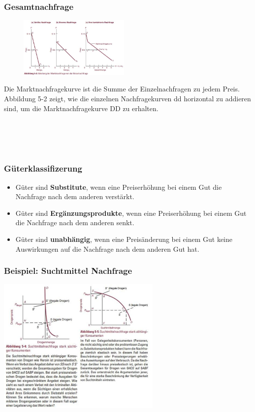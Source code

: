 \documentclass[10pt]{scrartcl}
\begin{document}
\subsubsection{Gesamtnachfrage}
\begin{figure}
\vspace{-20pt}
  \begin{center}
    \includegraphics[width=0.48\textwidth]{img/kombinierte-nachfrage.jpg}
  \end{center}
  \vspace{-20pt}
\end{figure}
Die Marktnachfragekurve ist die Summe der Einzelnachfragen zu jedem Preis. Abbildung 5-2 zeigt, wie die einzelnen Nachfragekurven dd horizontal zu addieren sind, um die 
Marktnachfragekurve DD zu erhalten. \\ \\ \\ \\ \\
\subsubsection{Güterklassifizerung}
\begin{itemize}
\item Güter sind {\bf Substitute}, wenn eine Preiserhöhung bei einem Gut die Nachfrage nach dem anderen verstärkt.
\item Güter sind {\bf Ergänzungsprodukte}, wenn eine Preiserhöhung bei einem Gut die Nachfrage nach dem anderen senkt.
\item Güter sind {\bf unabhängig}, wenn eine Preisänderung bei einem Gut keine Auswirkungen auf die Nachfrage nach dem anderen Gut hat. 
\end{itemize}
\subsubsection{Beispiel: Suchtmittel Nachfrage}
\includegraphics[width=0.6\textwidth]{img/junkies.jpg}
\newpage
\end{document}

